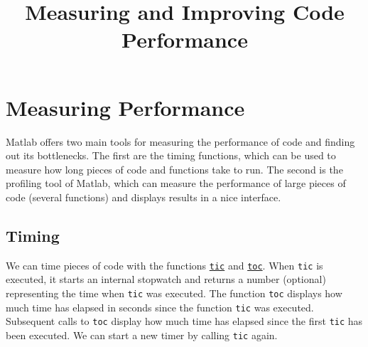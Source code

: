 \documentclass[12pt, a4paper]{article}
\date{}
\title{Measuring and Improving Code Performance}
\begin{document}
\maketitle
\section{Measuring Performance}
\label{sec:org66d4946}
Matlab offers two main tools for measuring the performance of code and finding out its bottlenecks.
The first are the timing functions, which can be used to measure how long pieces of code and functions take to run.
The second is the profiling tool of Matlab, which can measure the performance of large pieces of code (several functions) and displays results in a nice interface.
\subsection{Timing}
\label{sec:org79e4a32}
We can time pieces of code with the functions \href{https://www.mathworks.com/help/matlab/ref/tic.html?s\_tid=doc\_ta}{\texttt{tic}} and \href{https://www.mathworks.com/help/matlab/ref/toc.html?s\_tid=doc\_ta}{\texttt{toc}}.
When \texttt{tic} is executed, it starts an internal stopwatch and returns a number (optional) representing the time when \texttt{tic} was executed.
The function \texttt{toc} displays how much time has elapsed in seconds since the function \texttt{tic} was executed.
Subsequent calls to \texttt{toc} display how much time has elapsed since the first \texttt{tic} has been executed.
We can start a new timer by calling \texttt{tic} again.
\end{document}
